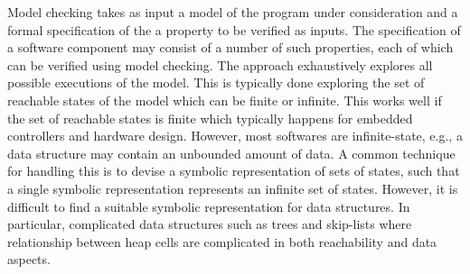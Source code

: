 Model checking takes as input a model of the program under
consideration and a formal specification of the a property to be verified as inputs. The specification of a software component may consist of a number of such properties, each of which can be verified using model checking. The approach exhaustively explores all possible executions of the model. This is typically done exploring the set of reachable states of the model  which can be finite or infinite. 
This works well if the set of reachable states is finite which typically happens for embedded controllers and hardware design. However, most softwares are infinite-state, e.g., a data structure may contain an unbounded amount of data. A common technique for handling this is to devise a symbolic representation of sets of states, such that a single symbolic representation represents an infinite set of states. 
However, it is difficult to find a suitable symbolic representation for data structures. In particular, complicated data structures such as trees and skip-lists where relationship between heap cells are complicated in both reachability and data aspects.


